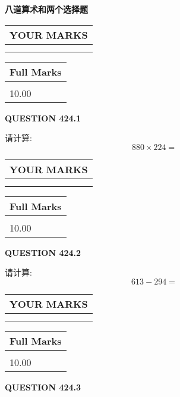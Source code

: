 \documentclass{ctexart}
\begin{document}
   
 \vspace{0.2in}
{\LARGE {\textbf{ 八道算术和两个选择题}}}
   
   
  
\vspace{0.2in}
  
\noindent\begin{tabular}{|l|}
\hline
 YOUR MARKS  \\
\hline
 \\ 
 \\ 
\hline
\end{tabular}
\hspace{0.05in} \begin{tabular}{|l|}
\hline
 Full Marks  \\
\hline
 \\ 
10.00 \\
\hline
\end{tabular}
{\textbf{\Large{QUESTION
424.1 
}}}
  
  
 
请计算:
\begin{equation}
880  \times    %
224 = \nonumber
\end{equation}
 

 

 
  
\vspace{0.2in}
  
\noindent\begin{tabular}{|l|}
\hline
 YOUR MARKS  \\
\hline
 \\ 
 \\ 
\hline
\end{tabular}
\hspace{0.05in} \begin{tabular}{|l|}
\hline
 Full Marks  \\
\hline
 \\ 
10.00 \\
\hline
\end{tabular}
{\textbf{\Large{QUESTION
424.2 
}}}
  
  
 
请计算:
\begin{equation}
613 -   %
294 = \nonumber
\end{equation}
 

 

 
  
\vspace{0.2in}
  
\noindent\begin{tabular}{|l|}
\hline
 YOUR MARKS  \\
\hline
 \\ 
 \\ 
\hline
\end{tabular}
\hspace{0.05in} \begin{tabular}{|l|}
\hline
 Full Marks  \\
\hline
 \\ 
10.00 \\
\hline
\end{tabular}
{\textbf{\Large{QUESTION
424.3 
}}}
  
\end{document}
